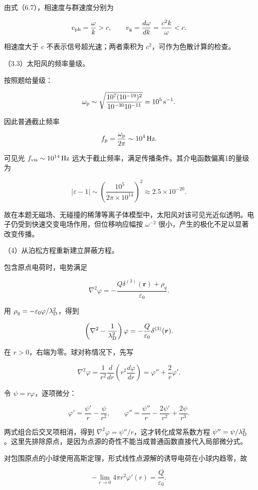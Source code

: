 \documentclass[12pt,a4paper,fontset=fandol]{ctexart}
\begin{document}
由式（6.7），相速度与群速度分别为

\[
v_{\rm ph}=\frac{\omega}{k}>c,\qquad
v_{\rm g}=\frac{d\omega}{dk}=\frac{c^2k}{\omega}<c.
\]

相速度大于 \(c\) 不表示信号超光速；两者乘积为
\(c^2\)，可作为色散计算的检查。

（3.3）太阳风的频率量级。

按照题给量级：

\[
\omega_{\rm p}\sim
\sqrt{\frac{10^7(10^{-19})^2}{10^{-30}10^{-11}}}
=10^5\,\mathrm{s^{-1}}.
\]

因此普通截止频率

\[
f_{\rm p}=\frac{\omega_{\rm p}}{2\pi}\sim10^4\,\mathrm{Hz}.
\]

可见光 \(f_{\rm vis}\sim10^{14}\,\mathrm{Hz}\)
远大于截止频率，满足传播条件。其介电函数偏离1的量级为

\[
\left|\varepsilon-1\right|
\sim\left(\frac{10^5}{2\pi\times10^{14}}\right)^2
\approx2.5\times10^{-20}.
\]

故在本题无磁场、无碰撞的稀薄等离子体模型中，太阳风对该可见光近似透明。电子仍受到快速交变电场作用，但位移响应幅按
\(\omega^{-2}\) 很小，产生的极化不足以显著改变传播。

（4）从泊松方程重新建立屏蔽方程。

包含原点电荷时，电势满足

\[
\nabla^2\varphi
=-\frac{Q\delta^{(3)}(\boldsymbol r)+\rho_q}{\varepsilon_0}.
\]

用 \(\rho_q=-\varepsilon_0\varphi/\lambda_{\rm D}^2\)，得到

\[
\left(\nabla^2-\frac1{\lambda_{\rm D}^2}\right)\varphi
=-\frac Q{\varepsilon_0}\delta^{(3)}(\boldsymbol r).
\]

在 \(r>0\)，右端为零。球对称情况下，先写

\[
\nabla^2\varphi
=\frac1{r^2}\frac d{dr}\left(r^2\frac{d\varphi}{dr}\right)
=\varphi''+\frac2r\varphi'.
\]

令 \(\psi=r\varphi\)，逐项微分：

\[
\varphi'=\frac{\psi'}r-\frac{\psi}{r^2},\qquad
\varphi''=\frac{\psi''}r-\frac{2\psi'}{r^2}
+\frac{2\psi}{r^3}.
\]

两式组合后交叉项相消，得到
\(\nabla^2\varphi=\psi''/r\)，这才转化成常系数方程
\(\psi''=\psi/\lambda_{\rm D}^2\)。这里先排除原点，是因为点源的奇性不能当成普通函数直接代入局部微分式。

对包围原点的小球使用高斯定理，形式线性点源解的诱导电荷在小球内趋零，故

\[
-\lim_{r\to0}4\pi r^2\varphi'(r)=\frac Q{\varepsilon_0}.
\]
\end{document}
